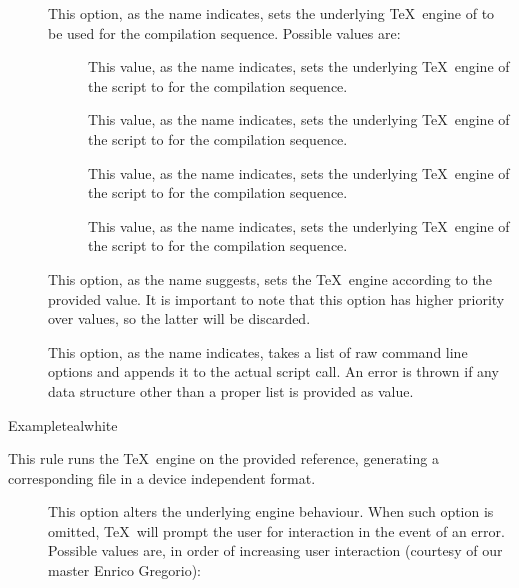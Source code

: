 \begin{description}
\begin{description}
\item[] This option, as the name indicates, sets the underlying \TeX\ engine of  to be used for the compilation sequence. Possible values are:

\begin{description}
\item[] This value, as the name indicates, sets the underlying \TeX\ engine of the script to  for the compilation sequence.

\item[] This value, as the name indicates, sets the underlying \TeX\ engine of the script to  for the compilation sequence.

\item[] This value, as the name indicates, sets the underlying \TeX\ engine of the script to  for the compilation sequence.

\item[] This value, as the name indicates, sets the underlying \TeX\ engine of the script to  for the compilation sequence.
\end{description}

\item[] This option, as the name suggests, sets the \TeX\ engine according to the provided value. It is important to note that this option has higher priority over  values, so the latter will be discarded.

\item[] This option, as the name indicates, takes a list of raw command line options and appends it to the actual script call. An error is thrown if any data structure other than a proper list is provided as value.
\end{description}

\begin{codebox}{Example}{teal}{\icnote}{white}
\end{codebox}

\item[\rulebox{latex}{Marco Daniel, Paulo Cereda}] This rule runs the  \TeX\ engine on the provided  reference, generating a corresponding file in a device independent format.

\begin{description}
\item[] This option alters the underlying engine behaviour. When such option is omitted, \TeX\ will prompt the user for interaction in the event of an error. Possible values are, in order of increasing user interaction (courtesy of our master Enrico Gregorio):


\end{description}
\end{description}
